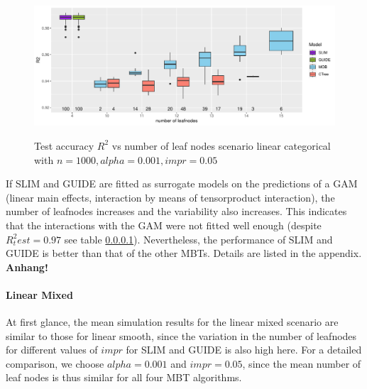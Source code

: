 \begin{figure} 
\caption{Test accuracy $R^2$ vs number of leaf nodes scenario linear categorical with $n=1000, alpha = 0.001, impr = 0.05$}
    \includegraphics[width=16cm]{Figures/simulations/batchtools/basic_scenarios/linear_abrupt/la_1000_standalone_r2_test.pdf}
    \label{fig:la_1000_standalone_r2_test}
\end{figure} 


If SLIM and GUIDE are fitted as surrogate models on the predictions of a GAM (linear main effects, interaction by means of tensorproduct interaction), the number of leafnodes increases and the variability also increases. This indicates that the interactions with the GAM were not fitted well enough (despite $R^2_test = 0.97$ see table \ref{}).
Nevertheless, the performance of SLIM and GUIDE is better than that of the other MBTs. Details are listed in the appendix. \textbf{Anhang!}




\paragraph{Linear Mixed}
At first glance, the mean simulation results for the linear mixed scenario are similar to those for linear smooth, since the variation in the number of leafnodes for different values of $impr$ for SLIM and GUIDE is also high here. 
For a detailed comparison, we choose $alpha = 0.001$ and $impr = 0.05$, since the mean number of leaf nodes is thus similar for all four MBT algorithms.



